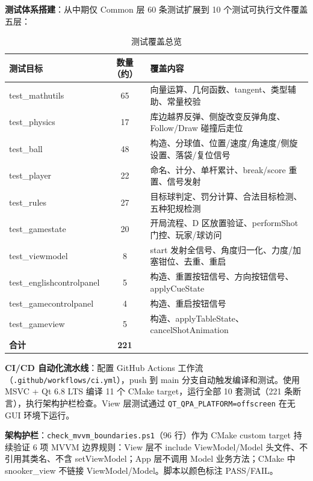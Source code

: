 \documentclass[11pt]{ctexart}
\begin{document}
\textbf{测试体系搭建}：从中期仅 Common 层 60 条测试扩展到 10 个测试可执行文件覆盖五层：

\begin{table}[H]
\centering\small
\begin{tabular}{|p{3.5cm}|c|p{5.6cm}|}
\hline
\textbf{测试目标} & \textbf{数量（约）} & \textbf{覆盖内容} \\
\hline
test\_mathutils       & 65 & 向量运算、几何函数、tangent、类型辅助、常量校验 \\
test\_physics         & 17 & 库边越界反弹、侧旋改变反弹角度、Follow/Draw 碰撞后走位 \\
test\_ball            & 48 & 构造、分球值、位置/速度/角速度/侧旋设置、落袋/复位信号 \\
test\_player          & 22 & 命名、计分、单杆累计、break/score 重置、信号发射 \\
test\_rules           & 27 & 目标球判定、罚分计算、合法目标检测、五种犯规检测 \\
test\_gamestate       & 20 & 开局流程、D 区放置验证、performShot 门控、玩家/球访问 \\
test\_viewmodel       & 8  & start 发射全信号、角度归一化、力度/加塞钳位、去重、重启 \\
test\_englishcontrolpanel & 5 & 构造、重置按钮信号、方向按钮信号、applyCueState \\
test\_gamecontrolpanel    & 4 & 构造、重启按钮信号 \\
test\_gameview            & 5 & 构造、applyTableState、cancelShotAnimation \\
\hline
\textbf{合计}         & \textbf{221} & \\
\hline
\end{tabular}
\caption{测试覆盖总览}
\end{table}

\textbf{CI/CD 自动化流水线}：配置 GitHub Actions 工作流（\texttt{.github/workflows/ci.yml}），push 到 main 分支自动触发编译和测试。使用 MSVC + Qt 6.8 LTS 编译 11 个 CMake target，运行全部 10 套测试（221 条断言），执行架构护栏检查。View 层测试通过 \texttt{QT\_QPA\_PLATFORM=offscreen} 在无 GUI 环境下运行。

\textbf{架构护栏}：\texttt{check\_mvvm\_boundaries.ps1}（96 行）作为 CMake custom target 持续验证 6 项 MVVM 边界规则：View 层不 include ViewModel/Model 头文件、不引用其类名、不含 setViewModel；App 层不调用 Model 业务方法；CMake 中 snooker\_view 不链接 ViewModel/Model。脚本以颜色标注 PASS/FAIL。
\end{document}
